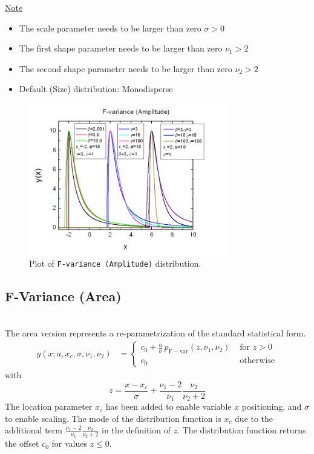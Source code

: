 \uline{Note}
\begin{itemize}
  \item The scale parameter needs to be larger than zero $\sigma>0$
  \item The first shape parameter needs to be larger than zero $\nu_1>2$
  \item The second shape parameter needs to be larger than zero $\nu_2>2$
  \item Default (Size) distribution: Monodisperse
\end{itemize}

\begin{figure}[htb]
\begin{center}
\includegraphics[width=0.768\textwidth]{FvarianceAmplitude.png}
\end{center}
\caption{Plot of \texttt{F-variance (Amplitude)} distribution.}
\label{fig:FvarianceAmplitude}
\end{figure}

\vspace{5mm}
\subsection{F-Variance (Area)} ~\\
\label{sec:FVarianceArea}
The area version represents a re-parametrization of the standard statistical form.
\begin{align}
y(x;a,x_c,\sigma,\nu_1,\nu_2)
&=
\begin{cases}
c_0+\frac{a}{\sigma}\,p_\mathrm{F-var}(z,\nu_1,\nu_2) & \mbox{ for } z>0\\
c_0 & \mbox{ otherwise}
\end{cases}
\end{align}
with
\begin{equation}
z = \frac{x-x_c}{\sigma}+\frac{\nu_1-2}{\nu_1}\frac{\nu_2}{\nu_2+2}
\end{equation}
The location parameter $x_c$ has been added to enable variable $x$ positioning, and $\sigma$
to enable scaling. The mode of the distribution function is $x_c$ due to the additional term
$\frac{\nu_1-2}{\nu_1}\frac{\nu_2}{\nu_2+2}$ in the definition of $z$. The distribution
function returns the offset $c_0$ for values $z\leq 0$.

